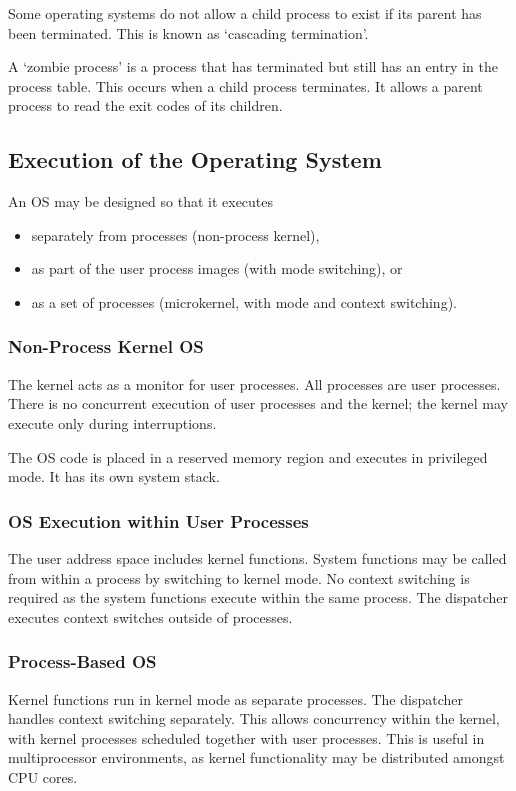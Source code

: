 Some operating systems do not allow a child process to exist if its parent has been terminated.
This is known as `cascading termination'.

A `zombie process' is a process that has terminated but still has an entry in the process table.
This occurs when a child process terminates.
It allows a parent process to read the exit codes of its children.

{\color{gray}
\subsection{Execution of the Operating System}

An OS may be designed so that it executes
\begin{itemize}
  \item separately from processes (non-process kernel),
  \item as part of the user process images (with mode switching), or
  \item as a set of processes (microkernel, with mode and context switching).
\end{itemize}

\subsubsection{Non-Process Kernel OS}

The kernel acts as a monitor for user processes.
All processes are user processes.
There is no concurrent execution of user processes and the kernel; the kernel may execute only during interruptions.

The OS code is placed in a reserved memory region and executes in privileged mode.
It has its own system stack.

\subsubsection{OS Execution within User Processes}

The user address space includes kernel functions.
System functions may be called from within a process by switching to kernel mode.
No context switching is required as the system functions execute within the same process.
The dispatcher executes context switches outside of processes.

\subsubsection{Process-Based OS}

Kernel functions run in kernel mode as separate processes.
The dispatcher handles context switching separately.
This allows concurrency within the kernel, with kernel processes scheduled together with user processes.
This is useful in multiprocessor environments, as kernel functionality may be distributed amongst CPU cores.
}
